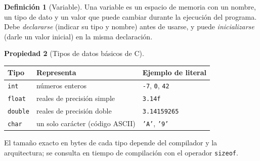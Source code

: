\documentclass[11pt,letterpaper]{article}
\theoremstyle{definition}
\newtheorem{definicion}{Definición}[section]
\newtheorem{propiedad}[definicion]{Propiedad}
\begin{document}
\begin{definicion}[Variable]
Una variable es un espacio de memoria con un nombre, un tipo de dato y un valor que puede cambiar
durante la ejecución del programa. Debe \emph{declararse} (indicar su tipo y nombre) antes de
usarse, y puede \emph{inicializarse} (darle un valor inicial) en la misma declaración.
\end{definicion}

\begin{propiedad}[Tipos de datos básicos de C]
\begin{center}
\begin{tabular}{|l|l|l|}
\hline
\textbf{Tipo} & \textbf{Representa} & \textbf{Ejemplo de literal} \\ \hline
\texttt{int} & números enteros & \texttt{-7}, \texttt{0}, \texttt{42} \\ \hline
\texttt{float} & reales de precisión simple & \texttt{3.14f} \\ \hline
\texttt{double} & reales de precisión doble & \texttt{3.14159265} \\ \hline
\texttt{char} & un solo carácter (código ASCII) & \texttt{'A'}, \texttt{'9'} \\ \hline
\end{tabular}
\end{center}
El tamaño exacto en bytes de cada tipo depende del compilador y la arquitectura; se consulta en
tiempo de compilación con el operador \texttt{sizeof}.
\end{propiedad}
\end{document}
